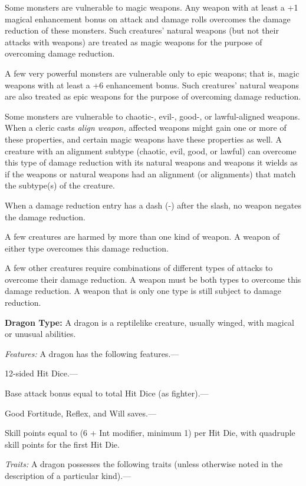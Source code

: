 \documentclass{article}
\begin{document}
Some monsters are vulnerable to magic weapons. Any weapon with at least a +1 magical 
enhancement bonus on attack and damage rolls overcomes the damage reduction of 
these monsters. Such creatures' natural weapons (but not their attacks with weapons) 
are treated as magic weapons for the purpose of overcoming damage reduction.

A few very powerful monsters are vulnerable only to epic weapons; that is, magic 
weapons with at least a +6 enhancement bonus. Such creatures' natural weapons are 
also treated as epic weapons for the purpose of overcoming damage reduction.

Some monsters are vulnerable to chaotic-, evil-, good-, or lawful-aligned weapons. 
When a cleric casts \textit{align weapon, }affected weapons might gain one or more 
of these properties, and certain magic weapons have these properties as well. A 
creature with an alignment subtype (chaotic, evil, good, or lawful) can overcome 
this type of damage reduction with its natural weapons and weapons it wields as 
if the weapons or natural weapons had an alignment (or alignments) that match the 
subtype(s) of the creature. 

When a damage reduction entry has a dash (-) after the slash, no weapon negates 
the damage reduction.

A few creatures are harmed by more than one kind of weapon. A weapon of either 
type overcomes this damage reduction.

A few other creatures require combinations of different types of attacks to overcome 
their damage reduction. A weapon must be both types to overcome this damage reduction. 
A weapon that is only one type is still subject to damage reduction.

\vspace{12pt}
\textbf{Dragon Type:} A dragon is a reptilelike creature, usually winged, with 
magical or unusual abilities.

\textit{Features: }A dragon has the following features.---

12-sided Hit Dice.---

Base attack bonus equal to total Hit Dice (as fighter).---

Good Fortitude, Reflex, and Will saves.---

Skill points equal to (6 + Int modifier, minimum 1) per Hit Die, with quadruple 
skill points for the first Hit Die.

\textit{Traits: }A dragon possesses the following traits (unless otherwise noted 
in the description of a particular kind).---
\end{document}
